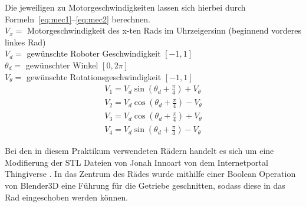 Die jeweiligen zu Motorgeschwindigkeiten lassen sich hierbei durch Formeln~\ref{eq:mec1}--\ref{eq:mec2} berechnen.\\

$V_x =$ Motorgeschwindigkeit des x-ten Rads im Uhrzeigersinn (beginnend vorderes linkes Rad)\\
$V_d =$ gewünschte Roboter Geschwindigkeit $[-1, 1]$\\
$\theta_d =$ gewünschter Winkel $[0, 2\pi]$\\
$V_\theta =$ gewünschte Rotationsgeschwindigkeit $[-1, 1]$\\


\begin{align}
	V_1 = V_d\sin{(\theta_d+\frac{\pi}{4})} + V_\theta \label{eq:mec1}\\
	V_2 = V_d\cos{(\theta_d+\frac{\pi}{4})} - V_\theta\\
	V_3 = V_d\cos{(\theta_d+\frac{\pi}{4})} + V_\theta\\
	V_4 = V_d\sin{(\theta_d+\frac{\pi}{4})} - V_\theta \label{eq:mec2}
\end{align} 

Bei den in diesem Praktikum verwendeten Rädern handelt es sich um eine Modifierung der STL Dateien von Jonah Innoart von dem Internetportal Thingiverse \cite{link:mecanum44}. 
In das Zentrum des Rädes wurde mithilfe einer Boolean Operation von Blender3D eine Führung für die Getriebe geschnitten, sodass diese in das Rad eingeschoben werden können.

